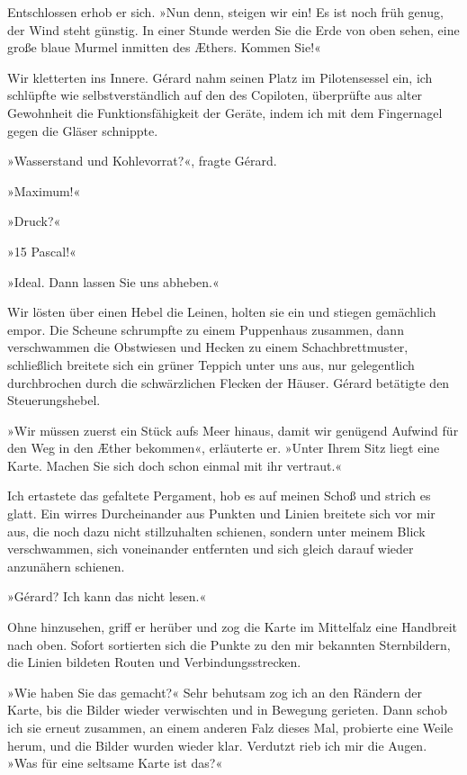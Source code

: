 Entschlossen erhob er sich. »Nun denn, steigen wir ein! Es ist noch
früh genug, der Wind steht günstig. In einer Stunde werden Sie die
Erde von oben sehen, eine große blaue Murmel inmitten des Æthers.
Kommen Sie!«

\bigpar

Wir kletterten ins Innere. Gérard nahm seinen Platz im
Pilotensessel ein, ich schlüpfte wie selbstverständlich auf den des
Copiloten, überprüfte aus alter Gewohnheit die Funktionsfähigkeit
der Geräte, indem ich mit dem Fingernagel gegen die Gläser
schnippte.

»Wasserstand und Kohlevorrat?«, fragte Gérard.

»Maximum!«

»Druck?«

»15 Pascal!«

»Ideal. Dann lassen Sie uns abheben.«

Wir lösten über einen Hebel die Leinen, holten sie ein und stiegen
gemächlich empor. Die Scheune schrumpfte zu einem Puppenhaus
zusammen, dann verschwammen die Obstwiesen und Hecken zu einem
Schachbrettmuster, schließlich breitete sich ein grüner Teppich
unter uns aus, nur gelegentlich durchbrochen durch die
schwärzlichen Flecken der Häuser. Gérard betätigte den
Steuerungshebel.

»Wir müssen zuerst ein Stück aufs Meer hinaus, damit wir genügend
Aufwind für den Weg in den Æther bekommen«, erläuterte er. »Unter
Ihrem Sitz liegt eine Karte. Machen Sie sich doch schon einmal mit
ihr vertraut.«

Ich ertastete das gefaltete Pergament, hob es auf meinen Schoß und
strich es glatt. Ein wirres Durcheinander aus Punkten und Linien
breitete sich vor mir aus, die noch dazu nicht stillzuhalten
schienen, sondern unter meinem Blick verschwammen, sich voneinander
entfernten und sich gleich darauf wieder anzunähern schienen.

»Gérard? Ich kann das nicht lesen.«

Ohne hinzusehen, griff er herüber und zog die Karte im Mittelfalz
eine Handbreit nach oben. Sofort sortierten sich die Punkte zu den
mir bekannten Sternbildern, die Linien bildeten Routen und
Verbindungsstrecken.

»Wie haben Sie das gemacht?« Sehr behutsam zog ich an den Rändern
der Karte, bis die Bilder wieder verwischten und in Bewegung
gerieten. Dann schob ich sie erneut zusammen, an einem anderen Falz
dieses Mal, probierte eine Weile herum, und die Bilder wurden
wieder klar. Verdutzt rieb ich mir die Augen. »Was für eine
seltsame Karte ist das?«

